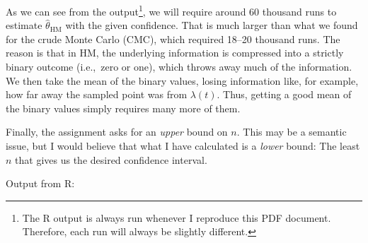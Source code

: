 \documentclass[a4paper,english,12pt]{article}
\begin{document}
As we can see from the output\footnote{The R output is always run
whenever I reproduce this PDF document. Therefore, each run will always be
slightly different.},
we will require around 60 thousand runs to estimate
$\hat{\theta}_{\textrm{HM}}$ with the given confidence. That is much larger
than what we found for the crude Monte Carlo (CMC), which required 18--20
thousand runs. The reason is that in HM, the underlying information is
compressed into a strictly binary outcome (i.e.,~zero or one), which throws away much of
the information. We then take the mean of the binary values, losing information
like, for example, how far away the sampled point was from $\lambda(t)$. Thus,
getting a good mean of the binary values simply requires many more of them.

Finally, the assignment asks for an \textit{upper} bound on $n$. This may be a
semantic issue, but I would believe that what I have calculated is a
\textit{lower} bound: The least $n$ that gives us the desired confidence
interval.

%
%

Output from R:

\clearpage


\end{document}
